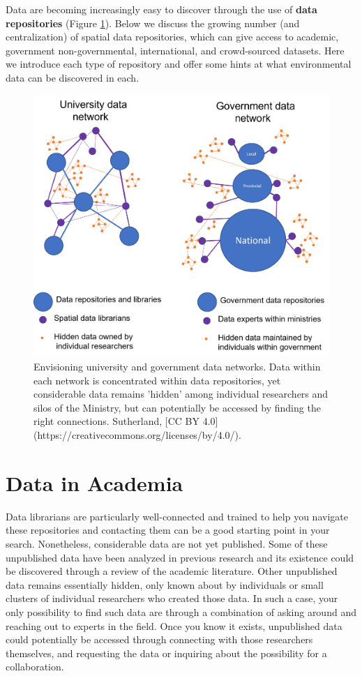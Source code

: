 \documentclass[
]{book}
\begin{document}
Data are becoming increasingly easy to discover through the use of \textbf{data repositories} (Figure \ref{fig:4-data-network-model}). Below we discuss the growing number (and centralization) of spatial data repositories, which can give access to academic, government non-governmental, international, and crowd-sourced datasets. Here we introduce each type of repository and offer some hints at what environmental data can be discovered in each.

\begin{figure}
\includegraphics[width=0.75\linewidth]{images/04-data-network-model} \caption{Envisioning university and government data networks. Data within each network is concentrated within data repositories, yet considerable data remains 'hidden' among individual researchers and silos of the Ministry, but can potentially be accessed by finding the right connections. Sutherland, [CC BY 4.0](https://creativecommons.org/licenses/by/4.0/).}\label{fig:4-data-network-model}
\end{figure}

\hypertarget{data-in-academia}{%
\section{Data in Academia}\label{data-in-academia}}

Data librarians are particularly well-connected and trained to help you navigate these repositories and contacting them can be a good starting point in your search. Nonetheless, considerable data are not yet published. Some of these unpublished data have been analyzed in previous research and its existence could be discovered through a review of the academic literature. Other unpublished data remains essentially hidden, only known about by individuals or small clusters of individual researchers who created those data. In such a case, your only possibility to find such data are through a combination of asking around and reaching out to experts in the field. Once you know it exists, unpublished data could potentially be accessed through connecting with those researchers themselves, and requesting the data or inquiring about the possibility for a collaboration.
\end{document}
